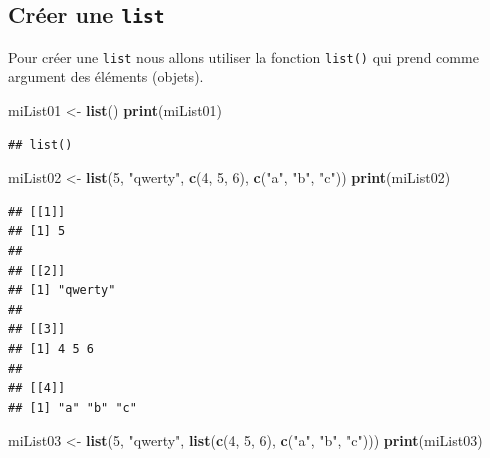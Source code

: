 \documentclass[twoside,symmetric]{book}
\newenvironment{Shaded}{}{}
\newcommand{\DecValTok}[1]{#1}
\newcommand{\KeywordTok}[1]{\textbf{#1}}
\newcommand{\NormalTok}[1]{#1}
\newcommand{\StringTok}[1]{#1}
\begin{document}
\hypertarget{cruxe9er-une-list}{%
\subsection{\texorpdfstring{Créer une \texttt{list}}{Créer une list}}\label{cruxe9er-une-list}}

Pour créer une \texttt{list} nous allons utiliser la fonction \texttt{list()} qui prend comme argument des éléments (objets).

\begin{Shaded}
\begin{Highlighting}[]
\NormalTok{miList01 <-}\StringTok{ }\KeywordTok{list}\NormalTok{()}
\KeywordTok{print}\NormalTok{(miList01)}
\end{Highlighting}
\end{Shaded}

\begin{verbatim}
## list()
\end{verbatim}

\begin{Shaded}
\begin{Highlighting}[]
\NormalTok{miList02 <-}\StringTok{ }\KeywordTok{list}\NormalTok{(}\DecValTok{5}\NormalTok{, }\StringTok{"qwerty"}\NormalTok{, }\KeywordTok{c}\NormalTok{(}\DecValTok{4}\NormalTok{, }\DecValTok{5}\NormalTok{, }\DecValTok{6}\NormalTok{), }\KeywordTok{c}\NormalTok{(}\StringTok{"a"}\NormalTok{, }\StringTok{"b"}\NormalTok{, }\StringTok{"c"}\NormalTok{))}
\KeywordTok{print}\NormalTok{(miList02)}
\end{Highlighting}
\end{Shaded}

\begin{verbatim}
## [[1]]
## [1] 5
## 
## [[2]]
## [1] "qwerty"
## 
## [[3]]
## [1] 4 5 6
## 
## [[4]]
## [1] "a" "b" "c"
\end{verbatim}

\begin{Shaded}
\begin{Highlighting}[]
\NormalTok{miList03 <-}\StringTok{ }\KeywordTok{list}\NormalTok{(}\DecValTok{5}\NormalTok{, }\StringTok{"qwerty"}\NormalTok{, }\KeywordTok{list}\NormalTok{(}\KeywordTok{c}\NormalTok{(}\DecValTok{4}\NormalTok{, }\DecValTok{5}\NormalTok{, }\DecValTok{6}\NormalTok{), }\KeywordTok{c}\NormalTok{(}\StringTok{"a"}\NormalTok{, }\StringTok{"b"}\NormalTok{, }\StringTok{"c"}\NormalTok{)))}
\KeywordTok{print}\NormalTok{(miList03)}
\end{Highlighting}
\end{Shaded}
\end{document}
